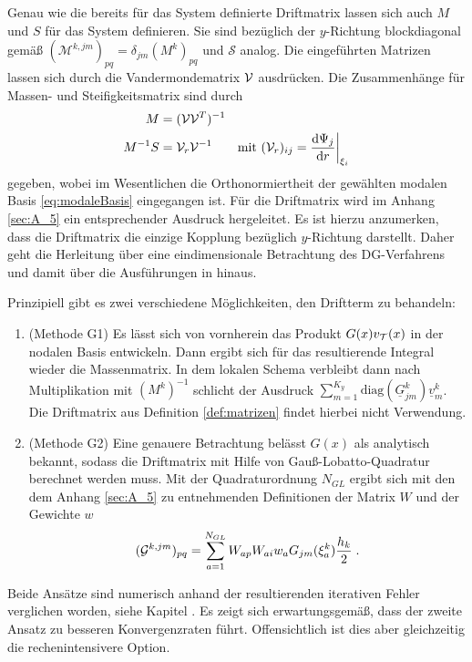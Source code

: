Genau wie die bereits für das System definierte Driftmatrix lassen sich auch $M$ und $S$ für das System definieren. Sie sind bezüglich der $y$-Richtung blockdiagonal gemäß $(\mathcal{M}^{k,jm})_{pq} = \delta_{jm}(M^k)_{pq}$ und $\mathcal{S}$ analog.
Die eingeführten Matrizen lassen sich durch die Vandermondematrix $\mathcal{V}$ ausdrücken. Die Zusammenhänge für Massen- und Steifigkeitsmatrix sind durch
\begin{align*}
  M &= (\mathcal{V}\mathcal{V}^T)^{-1} \\
  M^{-1}S &= \mathcal{V}_r \mathcal{V}^{-1} \qquad \text{mit } (\mathcal{V}_r)_{ij} = \frac{\mathrm{d}\Psi_j}{\mathrm{d}r}\biggr\rvert_{\xi_i}
\end{align*}
gegeben, wobei im Wesentlichen die Orthonormiertheit der gewählten modalen Basis \eqref{eq:modaleBasis} eingegangen ist. Für die Driftmatrix wird im Anhang \ref{sec:A_5} ein entsprechender Ausdruck hergeleitet. Es ist hierzu anzumerken, dass die Driftmatrix die einzige Kopplung bezüglich $y$-Richtung darstellt. Daher geht die Herleitung über eine eindimensionale Betrachtung des DG-Verfahrens und damit über die Ausführungen in \cite{buch} hinaus.

Prinzipiell gibt es zwei verschiedene Möglichkeiten, den Driftterm zu behandeln:
\begin{enumerate}
  \item (Methode G1) Es lässt sich von vornherein das Produkt $G(x)v_{\mathcal{T}}(x)$ in der nodalen Basis entwickeln. Dann ergibt sich für das resultierende Integral wieder die Massenmatrix. In dem lokalen Schema verbleibt dann nach Multiplikation mit $(M^k)^{-1}$ schlicht der Ausdruck ${\sum_{m=1}^{K_y}\text{diag}(\underline{G}^k_{jm})\underline{v}_m^k}$. Die Driftmatrix aus Definition \ref{def:matrizen} findet hierbei nicht Verwendung.
  \item (Methode G2) Eine genauere Betrachtung belässt $G(x)$ als analytisch bekannt, sodass die Driftmatrix mit Hilfe von Gauß-Lobatto-Quadratur berechnet werden muss. Mit der Quadraturordnung $N_{GL}$ ergibt sich mit den dem Anhang \ref{sec:A_5} zu entnehmenden Definitionen der Matrix $W$ und der Gewichte $w$
  \begin{equation}
    (\mathcal{G}^{k,jm})_{pq} = \sum_{a=1}^{N_{GL}} W_{ap} W_{ai} w_a G_{jm}(\xi_a^k)\frac{h_k}{2} \; .
    \label{eq:G_GL}
  \end{equation}
\end{enumerate}
Beide Ansätze sind numerisch anhand der resultierenden iterativen Fehler verglichen worden, siehe Kapitel . Es zeigt sich erwartungsgemäß, dass der zweite Ansatz zu besseren Konvergenzraten führt. Offensichtlich ist dies aber gleichzeitig die rechenintensivere Option.

